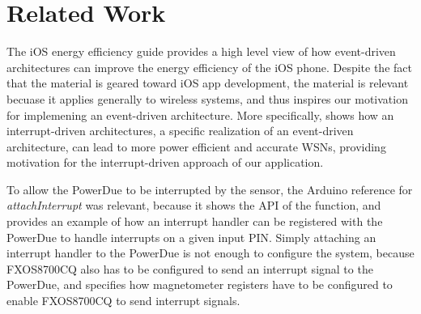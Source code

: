 \section{Related Work}
\label{sec:related}
The iOS energy efficiency guide \cite{iOSEnergy} provides a high level view of
how event-driven architectures can improve the energy efficiency of the iOS
phone. Despite the fact that the material is geared toward iOS app development,
the material is relevant becuase it applies generally to wireless systems, and
thus inspires our motivation for implemening an event-driven architecture. More
specifically, \cite{CargoNet} shows how an interrupt-driven architectures, a
specific realization of an event-driven architecture, can lead to more power
efficient and accurate WSNs, providing motivation for the interrupt-driven
approach of our application.

To allow the PowerDue to be interrupted by the sensor, the Arduino reference for
\textit{attachInterrupt} \cite{InterruptRef} was relevant, because it shows the
API of the function, and provides an example of how an interrupt handler can be
registered with the PowerDue to handle interrupts on a given input PIN. Simply
attaching an interrupt handler to the PowerDue is not enough to configure the
system, because FXOS8700CQ also has to be configured to send an interrupt signal
to the PowerDue, and \cite{DatasheetSPI} specifies how magnetometer registers
have to be configured to enable FXOS8700CQ to send interrupt signals.
